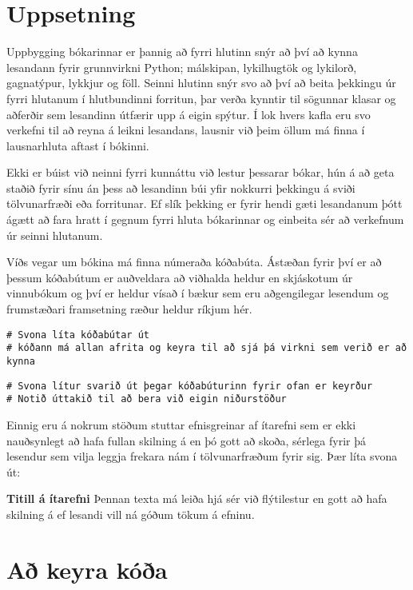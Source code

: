 \section{Uppsetning}
Uppbygging bókarinnar er þannig að fyrri hlutinn snýr að því að kynna lesandann fyrir grunnvirkni Python; málskipan, lykilhugtök og lykilorð, gagnatýpur, lykkjur og föll.
Seinni hlutinn snýr svo að því að beita þekkingu úr fyrri hlutanum í hlutbundinni forritun, þar verða kynntir til sögunnar klasar og aðferðir sem lesandinn útfærir upp á eigin spýtur.
Í lok hvers kafla eru svo verkefni til að reyna á leikni lesandans, lausnir við þeim öllum má finna í lausnarhluta aftast í bókinni.

Ekki er búist við neinni fyrri kunnáttu við lestur þessarar bókar, hún á að geta staðið fyrir sínu án þess að lesandinn búi yfir nokkurri þekkingu á sviði tölvunarfræði eða forritunar.
Ef slík þekking er fyrir hendi gæti lesandanum þótt ágætt að fara hratt í gegnum fyrri hluta bókarinnar og einbeita sér að verkefnum úr seinni hlutanum.

Víðs vegar um bókina má finna númeraða kóðabúta.
Ástæðan fyrir því er að þessum kóðabútum er auðveldara að viðhalda heldur en skjáskotum úr vinnubókum og því er heldur vísað í bækur sem eru aðgengilegar lesendum og frumstæðari framsetning ræður heldur ríkjum hér.
\lstset{style=uttak}
\lstset{style=venjulegt}
\begin{lstlisting}[caption=Kóðabútar kynntir til sögunnar]
# Svona líta kóðabútar út
# kóðann má allan afrita og keyra til að sjá þá virkni sem verið er að kynna
\end{lstlisting}
\lstset{style=uttak}
\begin{lstlisting}
# Svona lítur svarið út þegar kóðabúturinn fyrir ofan er keyrður
# Notið úttakið til að bera við eigin niðurstöður
\end{lstlisting}
\lstset{style=venjulegt}

Einnig eru á nokrum stöðum stuttar efnisgreinar af ítarefni sem er ekki nauðsynlegt að hafa fullan skilning á en þó gott að skoða, sérlega fyrir þá lesendur sem vilja leggja frekara nám í tölvunarfræðum fyrir sig.
Þær líta svona út:

\begin{itarefni}
\textbf{Titill á ítarefni}
Þennan texta má leiða hjá sér við flýtilestur en gott að hafa skilning á ef lesandi vill ná góðum tökum á efninu.
\end{itarefni}

\section{Að keyra kóða}\label{uk:keyra-koda}


